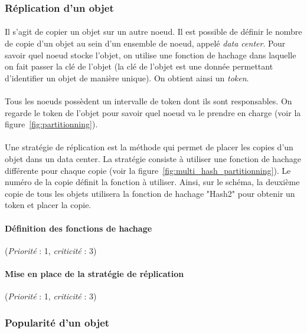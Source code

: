 \documentclass[12pt]{article}
\newcommand{\besoin}[2] {
  (\textit{Priorité} : #1, \textit{criticité} : #2)
}
\begin{document}
\subsubsection{Réplication d'un objet}
\paragraph{} Il s'agit de copier un objet sur un autre noeud. Il est possible de définir le nombre de copie d'un objet au sein d'un ensemble de noeud, appelé \textit{data center}. Pour savoir quel noeud stocke l'objet, on utilise une fonction de hachage dans laquelle on fait passer la clé de l'objet (la clé de l'objet est une donnée permettant d'identifier un objet de manière unique). On obtient ainsi un \textit{token}.

\paragraph{} Tous les noeuds possèdent un intervalle de token dont ils sont responsables. On regarde le token de l'objet pour savoir quel noeud va le prendre en charge (voir la figure~\ref{fig:partitionning}).

\paragraph{} Une stratégie de réplication est la méthode qui permet de placer les copies d'un objet dans un data center. La stratégie consiste à utiliser une fonction de hachage différente pour chaque copie (voir la figure~\ref{fig:multi_hash_partitionning}). Le numéro de la copie définit la fonction à utiliser. Ainsi, sur le schéma, la deuxième copie de tous les objets utilisera la fonction de hachage "Hash2" pour obtenir un token et placer la copie.

\paragraph{Définition des fonctions de hachage} \besoin{1}{3}
\paragraph{Mise en place de la stratégie de réplication} \besoin{1}{3}


\subsubsection{Popularité d'un objet}
\end{document}
